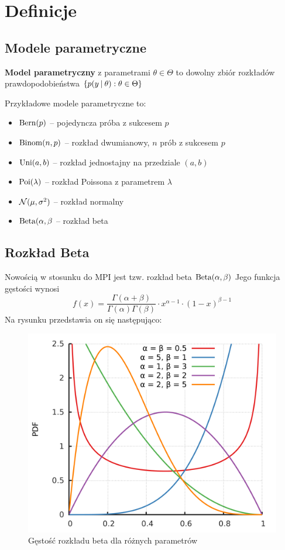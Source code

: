 \section{Definicje}

\subsection{Modele parametryczne}

\begin{definition}
\textbf{Model parametryczny} z parametrami \( \theta \in \Theta \) to dowolny zbiór rozkładów prawdopodobieństwa \( \set{p(y \given \theta) : \theta \in \Theta} \) 
\end{definition}

Przykładowe modele parametryczne to:
\begin{itemize}
    \item \(\operatorname{Bern}(p)\) -- pojedyncza próba z sukcesem \( p \)
    \item \(\operatorname{Binom}(n, p)\) -- rozkład dwumianowy, \( n \) prób z sukcesem \( p \)
    \item \(\operatorname{Uni}(a, b)\) -- rozkład jednostajny na przedziale \( (a, b) \)
    \item \(\operatorname{Poi}(\lambda)\) -- rozkład Poissona z parametrem \( \lambda \)
    \item \(\operatorname{\mathcal{N}}(\mu, \sigma^2)\) -- rozkład normalny
    \item \(\operatorname{Beta}(\alpha, \beta \) -- rozkład beta
\end{itemize}

\newpage
\subsection{Rozkład Beta}
Nowością w stosunku do MPI jest tzw. rozkład beta \( \operatorname{Beta}(\alpha, \beta) \)
Jego funkcja gęstości wynosi 
\[
    f(x) = \frac{\Gamma(\alpha + \beta)}{\Gamma(\alpha)\Gamma(\beta)}
        \cdot x^{\alpha - 1}
        \cdot (1-x)^{\beta - 1}
\]
Na rysunku przedstawia on się następująco:
\begin{figure}[H]
    \centering
    \includegraphics[scale=0.25]{img/beta-distribution.png}
    \caption{Gęstość rozkładu beta dla różnych parametrów}
\end{figure}

